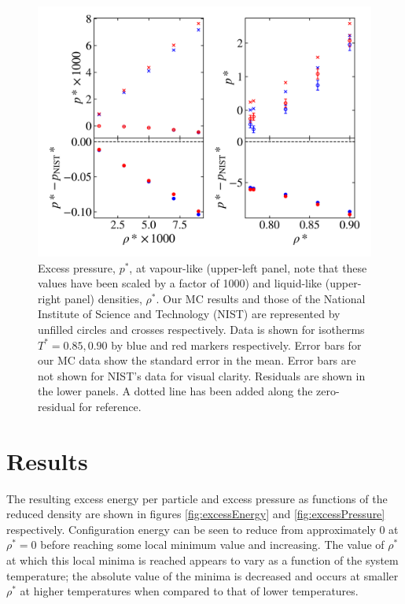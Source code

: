 \documentclass[10pt, twocolumn]{revtex4}    %
\begin{document}
\begin{figure}
	\includegraphics[width=\linewidth]{figures/NIST_comparison/NIST_p.png}
	\caption{Excess pressure, $p^{*}$, at vapour-like (upper-left panel, note that these values have been scaled by a factor of 1000) and liquid-like (upper-right panel) densities, $\rho{}^{*}$. Our MC results and those of the National Institute of Science and Technology (NIST) are represented by unfilled circles and crosses respectively. Data is shown for isotherms $T^{*}=0.85, 0.90$ by blue and red markers respectively. Error bars for our MC data show the standard error in the mean. Error bars are not shown for NIST's data for visual clarity. Residuals are shown in the lower panels. A dotted line has been added along the zero-residual for reference.}
	\label{fig:NIST_p}
\end{figure}



\section{Results} \label{s:results}

The resulting excess energy per particle and excess pressure as functions of the reduced density are shown in figures \ref{fig:excessEnergy} and \ref{fig:excessPressure} respectively. Configuration energy can be seen to reduce from approximately $0$ at $\rho{}^*=0$ before reaching some local minimum value and increasing. The value of $\rho{}^*$ at which this local minima is reached appears to vary as a function of the system temperature; the absolute value of the minima is decreased and occurs at smaller $\rho{}^*$ at higher temperatures when compared to that of lower temperatures.
\end{document}
